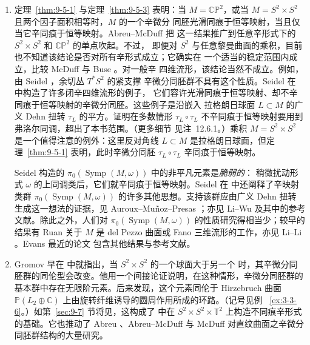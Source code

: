 \begin{remark}\label{rem:9-5-4}
\begin{enumerate}[label=\textup{(\roman*)}]
\item 定理~\ref{thm:9-5-1} 与定理~\ref{thm:9-5-3} 表明：当
$M=\mathbb{CP}^2$，或当 $M=S^2\times S^2$ 且两个因子面积相等时，$M$ 的一个辛微分
同胚光滑同痕于恒等映射，当且仅当它辛同痕于恒等映射。Abreu--McDuff  把
这一结果推广到任意辛形式下的 $S^2\times S^2$ 和 $\mathbb{CP}^2$ 的单点吹起。不过，
即便对 $S^2$ 与任意黎曼曲面的乘积，目前也不知道该结论是否对所有辛形式成立；它确实在
一个适当的稳定范围内成立，比较 McDuff  与 Buse 。对一般辛
四维流形，该结论当然不成立。例如，由 Seidel ，余切丛 $T^*S^2$ 的紧支撑
辛微分同胚群不具有这个性质。Seidel 在  中构造了许多闭辛四维流形的例子，
它们容许光滑同痕于恒等映射、却不辛同痕于恒等映射的辛微分同胚。这些例子是沿嵌入
拉格朗日球面 $L\subset M$ 的广义 Dehn 扭转 $\tau_L$ 的平方。证明在多数情形
$\tau_L\circ\tau_L$ 不辛同痕于恒等映射要用到 弗洛尔同调，超出了本书范围。（更多细节
见注~12.6.1。）乘积 $M=S^2\times S^2$ 是一个值得注意的例外：这里反对角线
$L\subset M$ 是拉格朗日球面，但定理~\ref{thm:9-5-1} 表明，此时辛微分同胚
$\tau_L\circ\tau_L$ 辛同痕于恒等映射。

Seidel 构造的 $\pi_0(\operatorname{Symp}(M,\omega))$ 中的非平凡元素是\emph{脆弱的}：
稍微扰动形式 $\omega$ 的上同调类后，它们就辛同痕于恒等映射。Seidel 在
 中还阐释了辛映射类群
$\pi_0(\operatorname{Symp}(M,\omega))$ 的许多其他思想。支持该群应由广义 Dehn 扭转
生成这一想法的证据，见 Auroux--Muñoz--Presas ；亦见 Li--Wu
 及其中的参考文献。除此之外，人们对
$\pi_0(\operatorname{Symp}(M,\omega))$ 的性质研究得相当少；较早的结果有 Ruan
 关于 $M$ 是 del Pezzo 曲面或 Fano 三维流形的工作，亦见 Li--Li
。Evans 最近的论文  包含其他结果与参考文献。

\item Gromov 早在  中就指出，当 $S^2\times S^2$ 的一个球面大于另一个
时，其辛微分同胚群的同伦型会改变。他用一个间接论证说明，在这种情形，辛微分同胚群的
基本群中存在无限阶元素。后来发现，这个元素同伦于 Hirzebruch 曲面
$\mathbb P(L_2\oplus\mathbb C)$ 上由旋转纤维诱导的圆周作用所成的环路。（记号见例
~\ref{ex:3-3-6}。）如第~\ref{sec:9-7} 节将见，这构成了  中在
$S^2\times S^2\times\mathbb T^2$ 上构造不同痕辛形式的基础。它也推动了 Abreu
、Abreu--McDuff  与 McDuff  对直纹曲面之辛微分
同胚群结构的大量研究。
\end{enumerate}
\end{remark}

